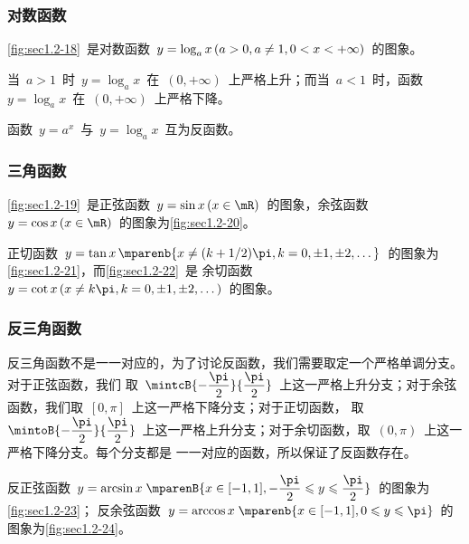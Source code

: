 \subsubsection{对数函数}

\ref{fig:sec1.2-18}~是对数函数~$y=\log_ax\mcond{a>0,a\neq1,0<x<+\infty}$~的图象。

当~$a>1$~时~$y=\log_ax$~在~$(0,+\infty)$~上严格上升；而当~$a<1$~时，函数~$y=\log_ax$~在~$(0,+\infty)$~上严格下降。

函数~$y=a^x$~与~$y=\log_ax$~互为反函数。

\subsubsection{三角函数}

\ref{fig:sec1.2-19}~是正弦函数~$y=\sin x\mcond{x\in\mR}$~的图象，余弦函数~$y=\cos x\mcond{x\in\mR}$~的图象为\ref{fig:sec1.2-20}。%

正切函数~$y=\tan x\,\mparenb{x\neq (k+\sfrac12)\pi,k=0,\pm1,\pm2,\dotsc}$~的图象为\ref{fig:sec1.2-21}，而\ref{fig:sec1.2-22}~是
余切函数~$y=\cot x\mcond{x\neq k\pi,k=0,\pm1,\pm2,\dotsc}$~的图象。

\begin{figure}
\begin{floatrow}
\end{floatrow}
\newFRline
\begin{floatrow}
\end{floatrow}
\end{figure}

\subsubsection{反三角函数}

反三角函数不是一一对应的，为了讨论反函数，我们需要取定一个严格单调分支。对于正弦函数，我们
取~$\mintcB{-\dfrac\pi2}{\dfrac\pi2}$~上这一严格上升分支；对于余弦函数，我们取~$[0,\pi]$~上这一严格下降分支；对于正切函数，%
取~$\mintoB{-\dfrac\pi2}{\dfrac\pi2}$~上这一严格上升分支；对于余切函数，取~$(0,\pi)$~上这一严格下降分支。每个分支都是
一一对应的函数，所以保证了反函数存在。

反正弦函数~$y=\arcsin x\;\mparenB{x\in[-1,1],-\dfrac\pi2\leq y\leq\dfrac\pi2}$~的图象为\ref{fig:sec1.2-23}；%
反余弦函数~$y=\arccos x\;\mparenb{x\in[-1,1],0\leq y\leq\pi}$~的图象为\ref{fig:sec1.2-24}。

